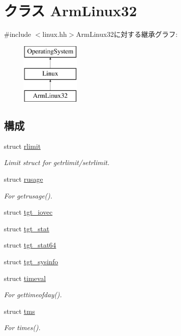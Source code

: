 \hypertarget{classArmLinux32}{
\section{クラス ArmLinux32}
\label{classArmLinux32}
}


{\ttfamily \#include $<$linux.hh$>$}ArmLinux32に対する継承グラフ:\begin{figure}[H]
\begin{center}
\leavevmode
\includegraphics[height=3cm]{classArmLinux32}
\end{center}
\end{figure}
\subsection*{構成}
\begin{DoxyCompactItemize}
\item 
struct \hyperlink{structArmLinux32_1_1rlimit}{rlimit}
\begin{DoxyCompactList}\small\item\em Limit struct for getrlimit/setrlimit. \item\end{DoxyCompactList}\item 
struct \hyperlink{structArmLinux32_1_1rusage}{rusage}
\begin{DoxyCompactList}\small\item\em For getrusage(). \item\end{DoxyCompactList}\item 
struct \hyperlink{structArmLinux32_1_1tgt__iovec}{tgt\_\-iovec}
\item 
struct \hyperlink{structArmLinux32_1_1tgt__stat}{tgt\_\-stat}
\item 
struct \hyperlink{structArmLinux32_1_1tgt__stat64}{tgt\_\-stat64}
\item 
struct \hyperlink{structArmLinux32_1_1tgt__sysinfo}{tgt\_\-sysinfo}
\item 
struct \hyperlink{structArmLinux32_1_1timeval}{timeval}
\begin{DoxyCompactList}\small\item\em For gettimeofday(). \item\end{DoxyCompactList}\item 
struct \hyperlink{structArmLinux32_1_1tms}{tms}
\begin{DoxyCompactList}\small\item\em For times(). \item\end{DoxyCompactList}\end{DoxyCompactItemize}
